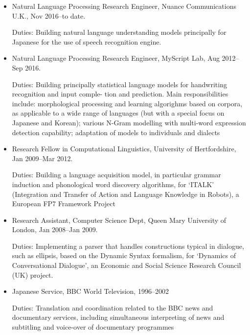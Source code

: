 \documentclass[a4paper]{article}
\begin{document}
\begin{itemize}

\item \hspace{-2mm}Natural Language Processing Research Engineer, Nuance Communications U.K., Nov 2016--to date.

\hspace{-2mm}Duties: Building natural language understanding models principally for Japanese for the use of speech recognition engine. 


\item \hspace{-2mm}Natural Language Processing Research Engineer, MyScript Lab,  Aug 2012--Sep 2016.

\hspace{-2mm}Duties: Building principally statistical language models for handwriting recognition and input comple- tion and prediction. Main responsibilities include: morphological processing and learning algorighms based on corpora, as applicable to a wide range of languages (but with a special focus on Japanese and Korean); various N-Gram modelling with multi-word expression detection capability; adaptation of models to individuals and dialects

\item \hspace{-.2cm}Research Fellow in Computational Linguistics,
  University of Hertfordshire, Jan 2009--Mar 2012. 

\hspace{-.2cm}Duties: Building a language acquisition model, in particular grammar induction and phonological word discovery algorithms, for `ITALK' (Integration and Transfer of Action and Language Knowledge in Robots), a European FP7 Framework Project

\item \hspace{-.2cm}Research Assistant, Computer Science Dept, Queen
  Mary University of London, Jan 2008--Jan 2009.

\hspace{-.2cm}Duties: Implementing a parser that handles constructions typical in dialogue, such as ellipsis, based on the Dynamic Syntax formalism, for `Dynamics of Conversational
Dialogue', an Economic and Social Science Research Council (UK)
project. 

\item\hspace{-.2cm}Japanese Service, BBC World Television, 1996--2002

Duties: Translation and coordination related to the BBC news and documentary services, including simultaneous interpreting of news and subtitling and voice-over of documentary programmes  

\end{itemize}
\end{document}
